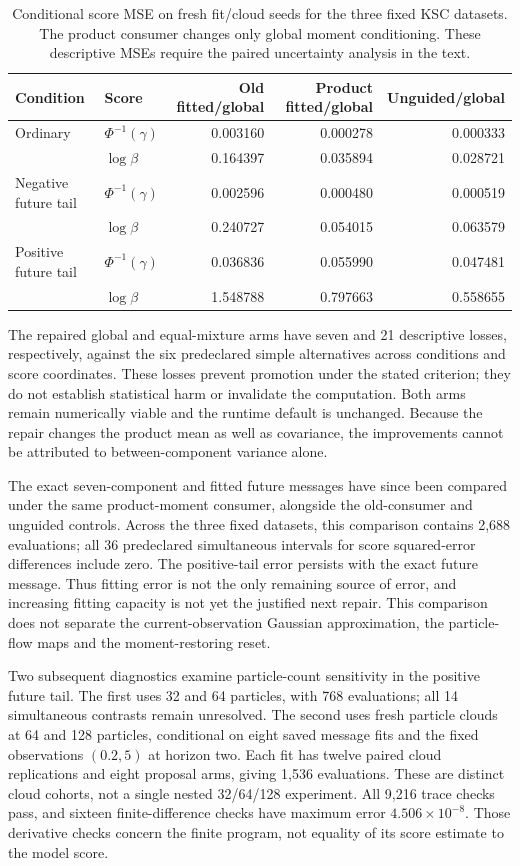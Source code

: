 \begin{table}[htbp]
\centering\small
\begin{tabular}{llrrr}
\toprule
Condition & Score & Old fitted/global & Product fitted/global & Unguided/global\\
\midrule
Ordinary & $\Phi^{-1}(\gamma)$ & 0.003160 & 0.000278 & 0.000333\\
 & $\log\beta$ & 0.164397 & 0.035894 & 0.028721\\
Negative future tail & $\Phi^{-1}(\gamma)$ & 0.002596 & 0.000480 & 0.000519\\
 & $\log\beta$ & 0.240727 & 0.054015 & 0.063579\\
Positive future tail & $\Phi^{-1}(\gamma)$ & 0.036836 & 0.055990 & 0.047481\\
 & $\log\beta$ & 1.548788 & 0.797663 & 0.558655\\
\bottomrule
\end{tabular}
\caption{Conditional score MSE on fresh fit/cloud seeds for the three fixed
KSC datasets. The product consumer changes only global moment conditioning.
These descriptive MSEs require the paired uncertainty analysis in the text.}
\label{tab:bg-product-mse}
\end{table}

The repaired global and equal-mixture arms have seven and 21 descriptive
losses, respectively, against the six predeclared simple alternatives across
conditions and score coordinates. These losses prevent promotion under the
stated criterion; they do not establish statistical harm or invalidate the
computation. Both arms remain numerically viable and the runtime default is
unchanged. Because the repair changes the product mean as well as covariance,
the improvements cannot be attributed to between-component variance alone.

The exact seven-component and fitted future messages have since been compared
under the same product-moment consumer, alongside the old-consumer and unguided
controls. Across the three fixed datasets, this comparison contains 2,688
evaluations; all 36 predeclared simultaneous intervals for score squared-error
differences include zero. The positive-tail error persists with the exact
future message. Thus fitting error is not the only remaining source of error,
and increasing fitting capacity is not yet the justified next repair. This
comparison does not separate the current-observation Gaussian approximation,
the particle-flow maps and the moment-restoring reset.

Two subsequent diagnostics examine particle-count sensitivity in the positive
future tail. The first uses 32 and 64 particles, with 768 evaluations; all 14
simultaneous contrasts remain unresolved. The second uses fresh particle
clouds at 64 and 128 particles, conditional on eight saved message fits and the
fixed observations $(0.2,5)$ at horizon two. Each fit has twelve paired cloud
replications and eight proposal arms, giving 1,536 evaluations. These are
distinct cloud cohorts, not a single nested 32/64/128 experiment. All 9,216
trace checks pass, and sixteen finite-difference checks have maximum error
$4.506\times10^{-8}$. Those derivative checks concern the finite program, not
equality of its score estimate to the model score.

